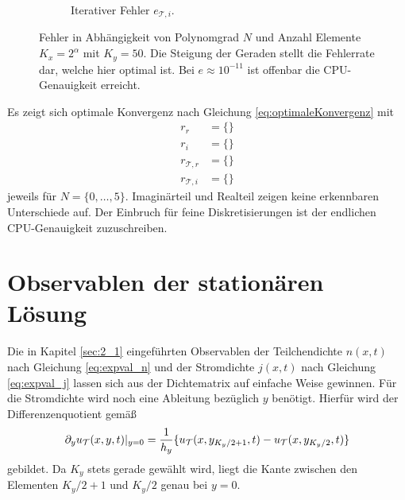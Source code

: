 \begin{figure}
\begin{subfigure}[b]{0.475\textwidth}
        \caption[]%
        {{\small Iterativer Fehler $e_{\mathcal{T},i}$.}}
    \end{subfigure}
    \caption[]
    {Fehler in Abhängigkeit von Polynomgrad $N$ und Anzahl Elemente $K_x=2^{\alpha}$ mit $K_y=50$. Die Steigung der Geraden stellt die Fehlerrate dar, welche hier optimal ist. Bei $e\approx10^{-11}$ ist offenbar die CPU-Genauigkeit erreicht.}
    \label{fig:testResult}
\end{figure}
Es zeigt sich optimale Konvergenz nach Gleichung \eqref{eq:optimaleKonvergenz} mit
\begin{align*}
  r_r &= \{\} \\
  r_i &= \{\} \\
  r_{\mathcal{T},r} &= \{\} \\
  r_{\mathcal{T},i} &= \{\}
\end{align*}
jeweils für $N=\{0,\dots,5\}$. Imaginärteil und Realteil zeigen keine erkennbaren Unterschiede auf. Der Einbruch für feine Diskretisierungen ist der endlichen CPU-Genauigkeit zuzuschreiben.

\section{Observablen der stationären Lösung}\label{sec:IV}
Die in Kapitel \ref{sec:2_1} eingeführten Observablen der Teilchendichte $n(x,t)$ nach Gleichung \eqref{eq:expval_n} und der Stromdichte $j(x,t)$ nach Gleichung \eqref{eq:expval_j} lassen sich aus der Dichtematrix auf einfache Weise gewinnen. Für die Stromdichte wird noch eine Ableitung bezüglich $y$ benötigt. Hierfür wird der Differenzenquotient gemäß
\begin{equation*}
  \partial_y u_{\mathcal{T}}(x,y,t)|_{y=0} = \frac{1}{h_y}\{u_{\mathcal{T}}(x,y_{K_y/2+1},t)-u_{\mathcal{T}}(x,y_{K_y/2},t)\}
\end{equation*}
gebildet. Da $K_y$ stets gerade gewählt wird, liegt die Kante zwischen den Elementen $K_y/2+1$ und $K_y/2$ genau bei $y=0$.

